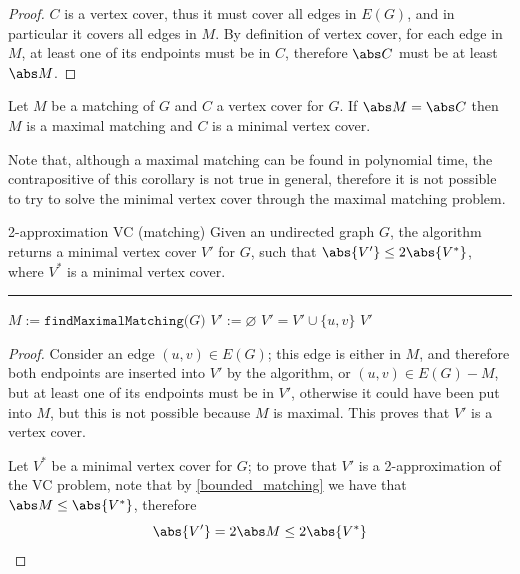 \documentclass[a4paper, 12pt]{report}
\begin{document}
    \begin{proof}
        $C$ is a vertex cover, thus it must cover all edges in $E(G)$, and in particular it covers all edges in $M$. By definition of vertex cover, for each edge in $M$, at least one of its endpoints must be in $C$, therefore $\abs C$ must be at least $\abs M$.
    \end{proof}

    \begin{framedcor}{}
        Let $M$ be a matching of $G$ and $C$ a vertex cover for $G$. If $\abs M = \abs C$ then $M$ is a maximal matching and $C$ is a minimal vertex cover.
    \end{framedcor}

    Note that, although a maximal matching can be found in polynomial time, the contrapositive of this corollary is not true in general, therefore it is not possible to try to solve the minimal vertex cover through the maximal matching problem.

    \begin{framedalgo}{2-approximation VC (matching)}
        Given an undirected graph $G$, the algorithm returns a minimal vertex cover $V'$ for $G$, such that $\abs{V'} \le 2 \abs {V^*}$, where $V^*$ is a minimal vertex cover. \\
        \hrule

        \quad
        \label{alg:2-approx_vc_matching}
        \begin{algorithmic}[1]
                \State $M := \texttt{findMaximalMatching(}G\texttt{)}$
                \State $V' := \varnothing$
                    \State $V' = V' \cup \{u, v\}$
                \EndFor
                \State {} $V'$
            \EndFunction
        \end{algorithmic}
    \end{framedalgo}



    \begin{proof}
        Consider an edge $(u, v) \in E(G)$; this edge is either in $M$, and therefore both endpoints are inserted into $V'$ by the algorithm, or $(u, v) \in E(G) - M$, but at least one of its endpoints must be in $V'$, otherwise it could have been put into $M$, but this is not possible because $M$ is maximal. This proves that $V'$ is a vertex cover.

        Let $V^*$ be a minimal vertex cover for $G$; to prove that $V'$ is a 2-approximation of the VC problem, note that by \cref{bounded_matching} we have that $\abs M \le \abs{V^*}$, therefore $$\abs{V'} = 2 \abs M \le 2 \abs{V^*}$$
    \end{proof}
\end{document}
